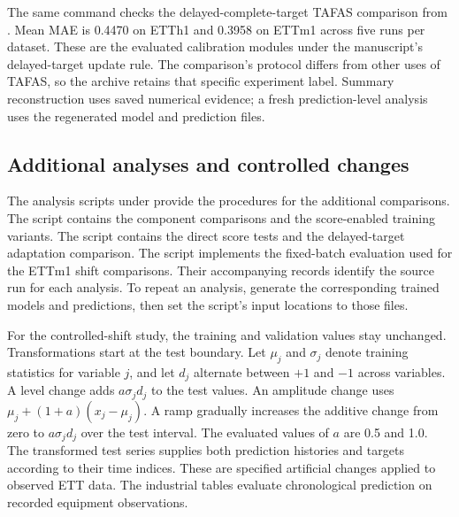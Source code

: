 The same command checks the delayed-complete-target TAFAS comparison from . Mean MAE is 0.4470 on ETTh1 and 0.3958 on ETTm1 across five runs per dataset. These are the evaluated calibration modules under the manuscript's delayed-target update rule. The comparison's protocol differs from other uses of TAFAS, so the archive retains that specific experiment label. Summary reconstruction uses saved numerical evidence; a fresh prediction-level analysis uses the regenerated model and prediction files.

\subsection*{Additional analyses and controlled changes}
The analysis scripts under  provide the procedures for the additional comparisons. The script  contains the component comparisons and the score-enabled training variants. The script  contains the direct score tests and the delayed-target adaptation comparison. The script  implements the fixed-batch evaluation used for the ETTm1 shift comparisons. Their accompanying records identify the source run for each analysis. To repeat an analysis, generate the corresponding trained models and predictions, then set the script's input locations to those files.

For the controlled-shift study, the training and validation values stay unchanged. Transformations start at the test boundary. Let $\mu_j$ and $\sigma_j$ denote training statistics for variable $j$, and let $d_j$ alternate between $+1$ and $-1$ across variables. A level change adds $a\sigma_jd_j$ to the test values. An amplitude change uses $\mu_j+(1+a)(x_j-\mu_j)$. A ramp gradually increases the additive change from zero to $a\sigma_jd_j$ over the test interval. The evaluated values of $a$ are 0.5 and 1.0. The transformed test series supplies both prediction histories and targets according to their time indices. These are specified artificial changes applied to observed ETT data. The industrial tables evaluate chronological prediction on recorded equipment observations.

